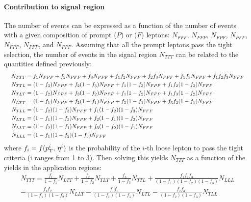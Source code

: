 \paragraph{Contribution to signal region\\}
The number of events can be expressed as a function of the number of events with a given composition of prompt ($P$) or \nonprompt ($F$) leptons:
$N_{FFF}$, $N_{FFP}$, $N_{FPF}$, $N_{PFF}$, $N_{FPP}$, $N_{PFP}$, and $N_{PPF}$.
Assuming that all the prompt leptons pass the tight selection, the number of \nonprompt events in the signal region $N_{TTT}$ can be related to the quantities defined previously:
\begin{equation}
  \resizebox{\textwidth}{!}{
    $\begin{aligned}
      N_{TTT} &= f_1 N_{FPP} + f_2 N_{PFP}+f_3 N_{PPF}+f_1 f_2 N_{FFP}+f_2 f_3 N_{PFF}+f_1 f_3 N_{FPF}+f_1 f_2 f_3 N_{FFF}\\
      N_{TTL} &= (1-f_3) N_{PPF} + f_2(1-f_3) N_{PFF} + f_1(1-f_3) N_{FPF} + f_1 f_2(1-f_3) N_{FFF}\\
      N_{TLT} &= (1-f_2) N_{PFP} + f_3(1-f_2) N_{PFF} + f_1(1-f_2) N_{FFP} + f_1 f_3(1-f_2) N_{FFF}\\
      N_{LTT} &= (1-f_1) N_{FPP} + f_2(1-f_1) N_{FFP} + f_3(1-f_1) N_{FPF} + f_3 f_2(1-f_1) N_{FFF}\\
      N_{TLL} &= (1-f_2)(1-f_3) N_{PFF} + f_1(1-f_2)(1-f_3) N_{FFF}\\
      N_{LTL} &= (1-f_1)(1-f_3) N_{FPF} + f_2(1-f_1)(1-f_3) N_{FFF}\\
      N_{LLT} &= (1-f_2)(1-f_1) N_{FFP} + f_3(1-f_2)(1-f_1) N_{FFF}\\
      N_{LLL} &= (1-f_1)(1-f_2)(1-f_3) N_{FFF}
    \end{aligned}$
  }
\end{equation}
where $f_i = f(p_{\mathrm{T}}^{i},\, \eta^{i})$ is the probability of the $i$-th loose \nonprompt lepton to pass the tight criteria (i ranges from 1 to 3).
Then solving this yields $N_{TTT}$ as a function of the yields in the application regions:
\begin{equation}
\begin{split}
N_{TTT} =
  \frac{f_1}{1-f_1} N_{LTT}
+ \frac{f_2}{1-f_2} N_{TLT}
+ \frac{f_3}{1-f_3} N_{TTL}
+ \frac{f_1 f_2 f_3}{(1-f_1)(1-f_2)(1-f_3)} N_{LLL}\\
- \frac{f_1 f_2}{(1-f_1)(1-f_2)} N_{LLT}
- \frac{f_1 f_3}{(1-f_1)(1-f_3)} N_{LTL}
- \frac{f_2 f_3}{(1-f_2)(1-f_3)} N_{TLL}
\end{split}
\end{equation}
